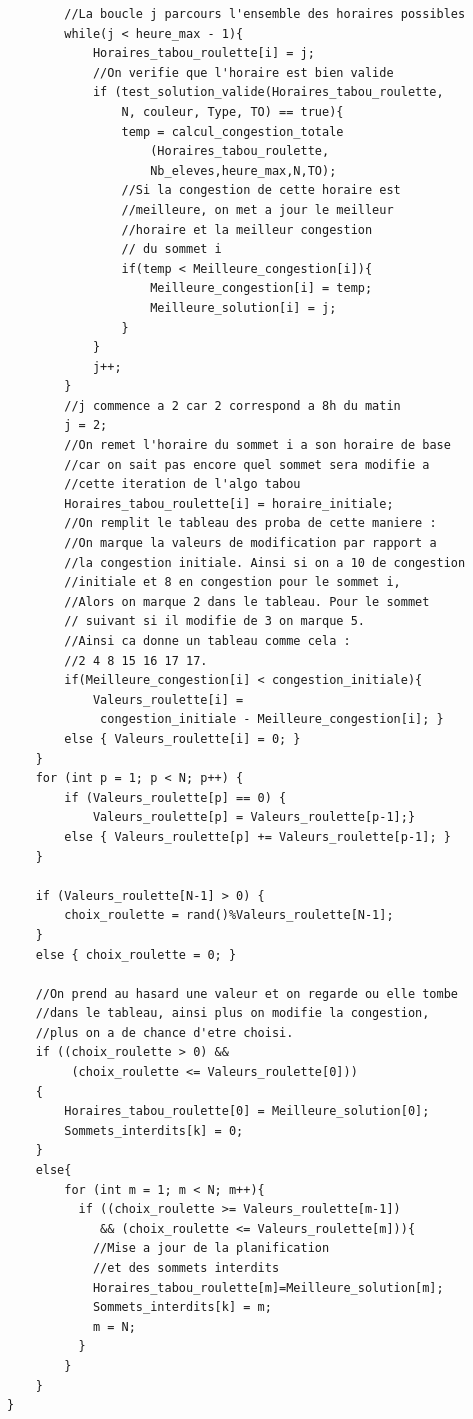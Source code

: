 \documentclass[a4paper,11pt]{article}
\begin{document}
\begin{lstlisting}
		//La boucle j parcours l'ensemble des horaires possibles
		while(j < heure_max - 1){
			Horaires_tabou_roulette[i] = j;
			//On verifie que l'horaire est bien valide
			if (test_solution_valide(Horaires_tabou_roulette, 
				N, couleur, Type, TO) == true){
				temp = calcul_congestion_totale
					(Horaires_tabou_roulette,
					Nb_eleves,heure_max,N,TO);
				//Si la congestion de cette horaire est 
				//meilleure, on met a jour le meilleur
				//horaire et la meilleur congestion
				// du sommet i
				if(temp < Meilleure_congestion[i]){
					Meilleure_congestion[i] = temp;
					Meilleure_solution[i] = j;
				}
			}
			j++;
		}
		//j commence a 2 car 2 correspond a 8h du matin 
		j = 2;
		//On remet l'horaire du sommet i a son horaire de base 
		//car on sait pas encore quel sommet sera modifie a 
		//cette iteration de l'algo tabou
		Horaires_tabou_roulette[i] = horaire_initiale;
		//On remplit le tableau des proba de cette maniere :
		//On marque la valeurs de modification par rapport a 
		//la congestion initiale. Ainsi si on a 10 de congestion 
		//initiale et 8 en congestion pour le sommet i,
		//Alors on marque 2 dans le tableau. Pour le sommet
		// suivant si il modifie de 3 on marque 5. 
		//Ainsi ca donne un tableau comme cela : 
		//2 4 8 15 16 17 17.
		if(Meilleure_congestion[i] < congestion_initiale){ 
			Valeurs_roulette[i] = 
			 congestion_initiale - Meilleure_congestion[i]; }
		else { Valeurs_roulette[i] = 0; }
	}
	for (int p = 1; p < N; p++) { 
		if (Valeurs_roulette[p] == 0) { 
			Valeurs_roulette[p] = Valeurs_roulette[p-1];} 
		else { Valeurs_roulette[p] += Valeurs_roulette[p-1]; }
	}
		
	if (Valeurs_roulette[N-1] > 0) {
		choix_roulette = rand()%Valeurs_roulette[N-1];
	}
	else { choix_roulette = 0; }

	//On prend au hasard une valeur et on regarde ou elle tombe 
	//dans le tableau, ainsi plus on modifie la congestion, 
	//plus on a de chance d'etre choisi.
	if ((choix_roulette > 0) &&
		 (choix_roulette <= Valeurs_roulette[0]))
	{
		Horaires_tabou_roulette[0] = Meilleure_solution[0];
		Sommets_interdits[k] = 0;
	}
	else{
		for (int m = 1; m < N; m++){
		  if ((choix_roulette >= Valeurs_roulette[m-1]) 
		     && (choix_roulette <= Valeurs_roulette[m])){
			//Mise a jour de la planification 
			//et des sommets interdits
			Horaires_tabou_roulette[m]=Meilleure_solution[m];
			Sommets_interdits[k] = m;
			m = N;
		  }
		}
	}
}
\end{lstlisting}
\end{document}
